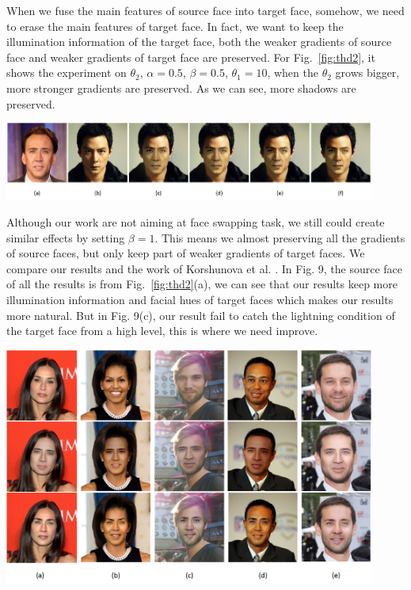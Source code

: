When we fuse the main features of source face into target face, somehow, we need to erase the main features of target face. In fact, we want to keep the illumination information of the target face, both the weaker gradients of source face and weaker gradients of target face are preserved. For Fig.~\ref{fig:thd2}, it shows the experiment on $\theta_2$,  $\alpha = 0.5$, $\beta = 0.5$, $\theta_1 = 10$, when the $\theta_2$ grows bigger, more stronger gradients are preserved. As we can see, more shadows are preserved.

\begin{center}
    \includegraphics[width=4.8in]{images/thd2.png}
    \label{fig:thd2}
\end{center}

Although our work are not aiming at face swapping task, we still could create similar effects by setting $\beta = 1$.
%
This means we almost preserving all the gradients of source faces, but only keep part of weaker gradients of target faces. We compare our results and the work of Korshunova et al. \cite{faceswapping}. In Fig. 9, the source face of all the results is from Fig.~\ref{fig:thd2}(a), we can see that our results keep more illumination information and facial hues of target faces which makes our results more natural. But in Fig. 9(c), our result fail to catch the lightning condition of the target face from a high level, this is where we need improve.

\begin{center}
    \includegraphics[width=4.8in]{images/vs.png}
    \label{fig:vs}
\end{center}

